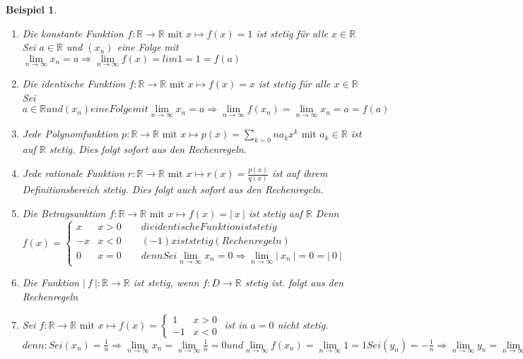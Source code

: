 \documentclass[a4paper,titlepage,oneside]{article}
\def\R{\ensuremath{\mathbb{R}} }
\renewcommand{\liminf}[2][n]{\ensuremath{\lim\limits_{#1 \rightarrow \infty}{#2}}}
\newcommand{\abs}[1]{\ensuremath{\left|\:#1\:\right|}}
\theoremstyle{thmstyle}
\newtheorem{bsp}[satz]{Beispiel}
\begin{document}
\begin{bsp}
\begin{enumerate}
\item Die konstante Funktion $ f : \R \to \R \text{ mit } x \mapsto f(x) = 1 $ ist stetig für alle $x \in \R$
Sei $a \in \R$ und $(x_n)$ eine Folge mit $\liminf{x_n} = a \Rightarrow \liminf{f(x)} = lim 1 = 1 = f(a)$

\item Die identische Funktion $f : \R \to \R \text{ mit } x \mapsto f(x) = x $  ist stetig für alle $x \in \R$
Sei $a\in \R und (x_n) eine Folge mit \liminf{x_n} = a \Rightarrow \liminf{f(x_n)} = \liminf{x_n} = a = f(a)$

\item Jede Polynomfunktion $p : \R \to \R \text{ mit } x \mapsto p(x) = \sum_{k=0}{n}{a_kx^k} \text{ mit } a_k \in \R $ ist auf \R stetig.
Dies folgt sofort aus den Rechenregeln.

\item Jede rationale Funktion  $r : \R \to \R \text{ mit } x \mapsto r(x) = \frac{p(x)}{q(x)} $ ist auf ihrem Definitionsbereich stetig.
Dies folgt auch sofort aus den Rechenregeln.

\item Die Betragsunktion $f : \R \to \R \text{ mit } x \mapsto f(x) = \abs{x} $  ist stetig auf \R
Denn $f(x) = \begin{cases}
x & x > 0 \qquad die identische Funktion ist stetig \\
-x & x < 0 \qquad (-1)x ist stetig (Rechenregeln) \\
0 & x = 0 \qquad denn Sei \liminf{x_n} = 0 \Rightarrow \liminf{\abs{x_n}} = 0 = \abs{0}
\end{cases}$

\item Die Funktion $\abs{f} : \R \to \R $  ist stetig, wenn $ f: D \to \R $ stetig ist.
folgt aus den Rechenregeln

\item Sei $f : \R \to \R \text{ mit } x \mapsto f(x) = \begin{cases} 1 & x > 0 \\ -1 & x < 0\end{cases} $ ist in $a = 0$ nicht stetig. %
\begin{math}
denn: Sei (x_n) =  \frac{1}{n} \Rightarrow \liminf{x_n} = \liminf{\frac{1}{n}} = 0  und \liminf{f(x_n)} = \liminf{1} = 1
Sei (y_n) = - \frac{1}{n} \Rightarrow \liminf{y_n} = \liminf{-\frac{1}{n}} = 0  und \liminf{f(y_n)} = \liminf{-1} = -1
\Rightarrow f ist nicht stetig in a = 0
\end{math}


\end{enumerate}
\end{bsp}
\end{document}
